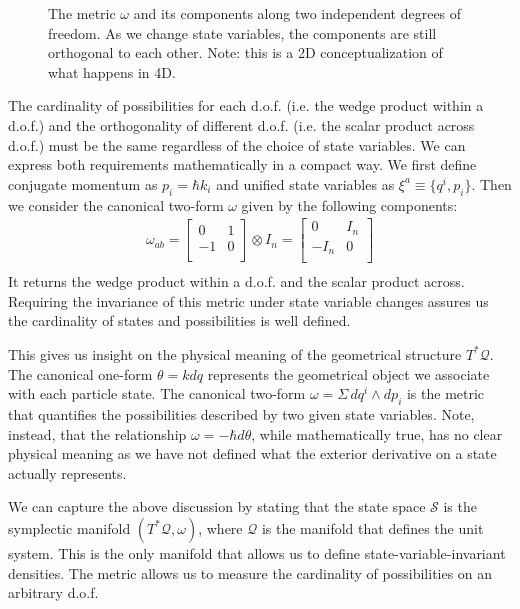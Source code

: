 \documentclass[aps,pra,10pt,twocolumn,floatfix,nofootinbib]{revtex4-1}
\numberwithin{equation}{section}
\theoremstyle{definition}
\begin{document}
\begin{figure}
	
	\caption{The metric $\omega$ and its components along two independent degrees of freedom. As we change state variables, the components are still orthogonal to each other. Note: this is a 2D conceptualization of what happens in 4D.}
	\label{fig:independent_dof}
\end{figure}

The cardinality of possibilities for each d.o.f. (i.e. the wedge product within a d.o.f.) and the orthogonality of different d.o.f. (i.e. the scalar product across d.o.f.) must be the same regardless of the choice of state variables. We can express both requirements mathematically in a compact way. We first define conjugate momentum as $p_i=\hbar k_i$ and unified state variables as $\xi^a\equiv \{q^i, p_i\}$. Then we consider the canonical two-form $\omega$ given by the following components:
\begin{align*}
\omega_{ab} =  \left[
\begin{array}{cc}
0 & 1 \\
-1 & 0 \\
\end{array}
\right] \otimes I_n =
\left[
\begin{array}{cc}
0 & I_n \\
-I_n & 0 \\
\end{array}
\right] \\
\end{align*}
It returns the wedge product within a d.o.f. and the scalar product across. Requiring the invariance of this metric under state variable changes assures us the cardinality of states and possibilities is well defined.

This gives us insight on the physical meaning of the geometrical structure $T^*\mathcal{Q}$. The canonical one-form $\theta=k dq$ represents the geometrical object we associate with each particle state. The canonical two-form $\omega=\Sigma \, dq^i \wedge dp_i$ is the metric that quantifies the possibilities described by two given state variables. Note, instead, that the relationship $\omega = - \hbar d\theta$, while mathematically true, has no clear physical meaning as we have not defined what the exterior derivative on a state actually represents.

We can capture the above discussion by stating that the state space $\mathcal{S}$ is the symplectic manifold $(T^*\mathcal{Q}, \omega)$, where $\mathcal{Q}$ is the manifold that defines the unit system. This is the only manifold that allows us to define state-variable-invariant densities. The metric allows us to measure the cardinality of possibilities on an arbitrary d.o.f. 
\end{document}
